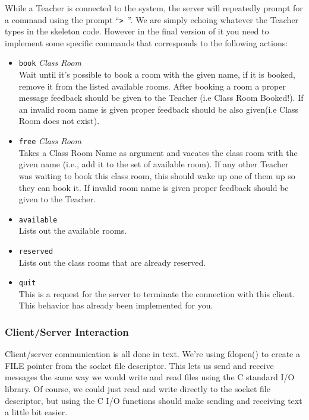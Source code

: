 \documentclass{article}
\begin{document}
\begin{enumerate}
  While a Teacher is connected to the system, the server will repeatedly prompt for a
  command using the prompt ``\verb$> $''.  We are simply echoing whatever the Teacher types in the skeleton code. However in the final version of it you need to implement some specific commands that corresponds to the following actions:

\begin{itemize}
\item \texttt{book} \textit{Class Room}\\
  Wait until it's possible to book a room with the given name, if it is booked, remove it from the listed available rooms. After booking a room a proper message feedback should be given to the Teacher (i.e Class Room Booked!). If an invalid room name is given proper feedback should be also given(i.e Class Room does not exist).
  
\item \texttt{free} \textit{Class Room}\\
  Takes a Class Room Name as argument and vacates the class room with the given name (i.e., add it to the set of
  available room).  If any other Teacher was waiting to book this class room, this should wake up one of them up so they can book it. If invalid room name is given proper feedback should be given to the Teacher.

\item \texttt{available}\\
  Lists out the available rooms.
  
\item \texttt{reserved}\\
  Lists out the class rooms that are already reserved.

\item \texttt{quit}\\
  This is a request for the server to terminate the connection with this
  client.  This behavior has already been implemented for you.

\end{itemize}

\subsubsection*{Client/Server Interaction}

  Client/server communication is all done in text.  We're using
  fdopen() to create a FILE pointer from the socket file descriptor.
  This lets us send and receive messages the same way we would
  write and read files using the C standard I/O library.  Of course,
  we could just read and write directly to the socket file descriptor,
  but using the C I/O functions should make sending and receiving text
  a little bit easier.


\end{enumerate}
\end{document}
